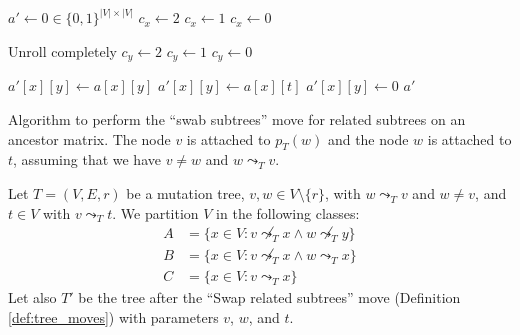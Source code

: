\begin{algorithm}[p]
    \begin{algorithmic}[1]
        \State $a' \leftarrow 0 \in \{0,1\}^{|V| \times |V|}$
                \State $c_x \leftarrow 2$
                \State $c_x \leftarrow 1$
            \Else
                \State $c_x \leftarrow 0$
            \EndIf

             \Comment Unroll completely
                    \State $c_y \leftarrow 2$
                    \State $c_y \leftarrow 1$
                \Else
                    \State $c_y \leftarrow 0$
                \EndIf

                    \State $a'[x][y] \leftarrow a[x][y]$
                    \State $a'[x][y] \leftarrow a[x][t]$
                \Else
                    \State $a'[x][y] \leftarrow 0$
                \EndIf
            \EndFor
        \EndFor
        \State \Return $a'$
        \EndFunction
    \end{algorithmic}
    \caption{Algorithm to perform the ``swab subtrees'' move for related subtrees on an ancestor matrix. The node $v$ is attached to $p_T(w)$ and the node $w$ is attached to $t$, assuming that we have $v \neq w$ and $w \leadsto_T v$.}
    \label{alg:am_swap_related}
\end{algorithm}

\begin{definition}
    \label{def:related_swap_classes}
    Let $T = (V, E, r)$ be a mutation tree, $v,w \in V \setminus \{r\}$, with $w \leadsto_T v$ and $w \neq v$, and $t \in V$ with $v \leadsto_T t$. We partition $V$ in the following classes:
    \begin{align*}
      A &= \{x \in V: v \not\leadsto_T x \wedge w \not\leadsto_T y\} \\
      B &= \{x \in V: v \not\leadsto_T x \wedge w \leadsto_T x\} \\
      C &= \{x \in V: v \leadsto_T x\}
    \end{align*}
    Let also $T'$ be the tree after the ``Swap related subtrees'' move (Definition \ref{def:tree_moves}) with parameters $v$, $w$, and $t$.
\end{definition}

